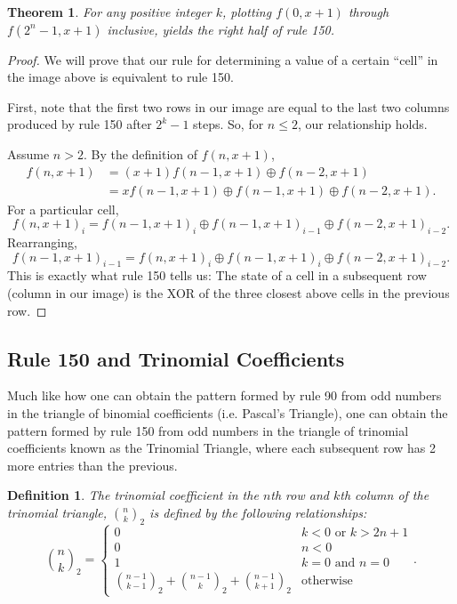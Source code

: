 \documentclass{article}
\newtheorem{theorem}{Theorem}
\newtheorem{definition}{Definition}
\newcommand{\xor}{\oplus}
\begin{document}
	\begin{theorem}
		For any positive integer $k$, plotting $f(0,x+1)$ through $f(2^n - 1,x+1)$ inclusive, yields the right half of rule 150.
	\end{theorem}
	\begin{proof}
		We will prove that our rule for determining a value of a certain ``cell'' in the image above is equivalent to rule 150.
		
		First, note that the first two rows in our image are equal to the last two columns produced by rule 150 after $2^k - 1$ steps.
		So, for $n \leq 2$, our relationship holds.
		
		Assume $n > 2$.
		By the definition of $f(n,x+1)$,
		\begin{align*}
			f(n,x+1) &= (x+1)f(n-1,x+1) \xor f(n-2,x+1) \\
			&= xf(n-1,x+1) \xor f(n-1,x+1) \xor f(n-2,x+1).
		\end{align*}
		For a particular cell,
		\begin{equation*}
			f(n,x+1)_i = f(n-1,x+1)_i \xor f(n-1,x+1)_{i-1} \xor f(n-2,x+1)_{i-2}.
		\end{equation*}
		Rearranging,
		\begin{equation*}
			f(n-1,x+1)_{i-1}  = f(n,x+1)_{i} \xor f(n-1,x+1)_{i} \xor f(n-2,x+1)_{i-2}.
		\end{equation*}
		This is exactly what rule 150 tells us: The state of a cell in a subsequent row (column in our image) is the XOR of the three closest above cells in the previous row.
	\end{proof}
	
	
	\subsection{Rule 150 and Trinomial Coefficients}
	Much like how one can obtain the pattern formed by rule 90 from odd numbers in the triangle of binomial coefficients (i.e. Pascal's Triangle), one can obtain the pattern formed by rule 150 from odd numbers in the triangle of trinomial coefficients known as the Trinomial Triangle, where each subsequent row has 2 more entries than the previous.
	
	\begin{definition}
		The trinomial coefficient in the $n$th row and $k$th column of the trinomial triangle, $\binom{n}{k}_2$ is defined by the following relationships:
		\begin{equation*}
			\binom{n}{k}_2 = \begin{cases}
				0 & k < 0 \text{ or } k > 2n + 1 \\
				0 & n < 0 \\
				1 & k = 0 \text{ and } n = 0 \\
				\binom{n-1}{k-1}_2 + \binom{n-1}{k}_2 + \binom{n-1}{k+1}_2 & \text{otherwise}
			\end{cases}.
		\end{equation*}
	\end{definition}
\end{document}
